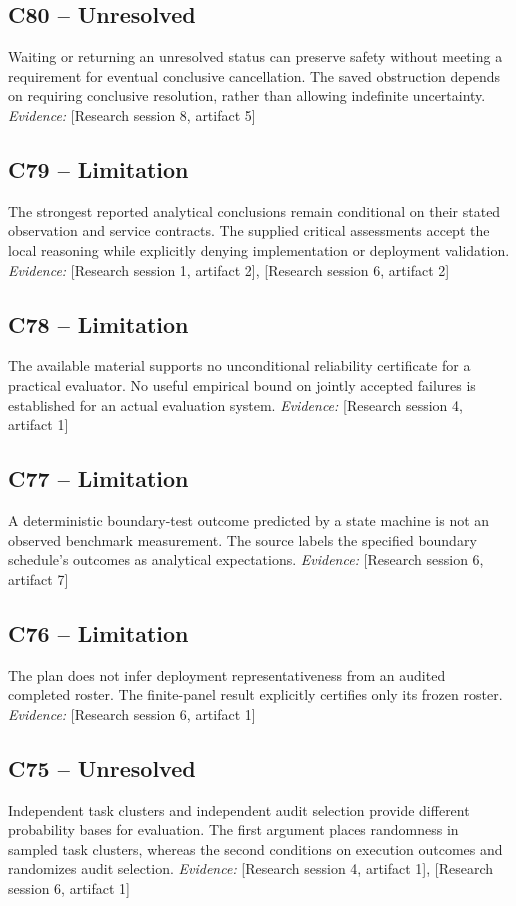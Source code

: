 \documentclass[11pt]{article}
\begin{document}
\begin{sloppypar}
\subsection{C80 -- Unresolved}
Waiting or returning an unresolved status can preserve safety without meeting a requirement for eventual conclusive cancellation.
The saved obstruction depends on requiring conclusive resolution, rather than allowing indefinite uncertainty.
\textit{Evidence: }[Research session 8, artifact 5]
\subsection{C79 -- Limitation}
The strongest reported analytical conclusions remain conditional on their stated observation and service contracts.
The supplied critical assessments accept the local reasoning while explicitly denying implementation or deployment validation.
\textit{Evidence: }[Research session 1, artifact 2], [Research session 6, artifact 2]
\subsection{C78 -- Limitation}
The available material supports no unconditional reliability certificate for a practical evaluator.
No useful empirical bound on jointly accepted failures is established for an actual evaluation system.
\textit{Evidence: }[Research session 4, artifact 1]
\subsection{C77 -- Limitation}
A deterministic boundary-test outcome predicted by a state machine is not an observed benchmark measurement.
The source labels the specified boundary schedule's outcomes as analytical expectations.
\textit{Evidence: }[Research session 6, artifact 7]
\subsection{C76 -- Limitation}
The plan does not infer deployment representativeness from an audited completed roster.
The finite-panel result explicitly certifies only its frozen roster.
\textit{Evidence: }[Research session 6, artifact 1]
\subsection{C75 -- Unresolved}
Independent task clusters and independent audit selection provide different probability bases for evaluation.
The first argument places randomness in sampled task clusters, whereas the second conditions on execution outcomes and randomizes audit selection.
\textit{Evidence: }[Research session 4, artifact 1], [Research session 6, artifact 1]

\end{sloppypar}
\end{document}
